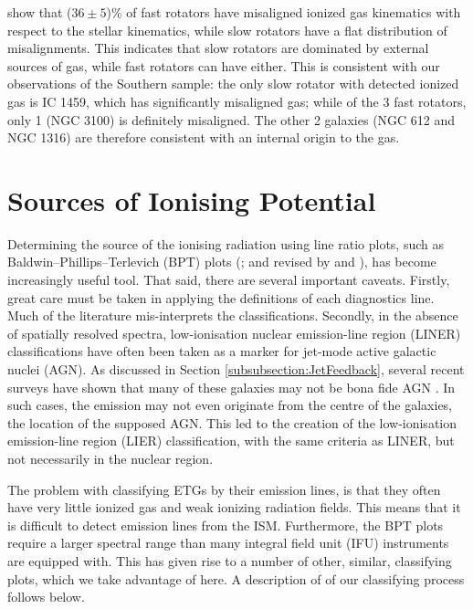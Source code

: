 
	\citet{Davis2011a} show that ($36\pm5$)\% of fast rotators have misaligned ionized gas kinematics with respect to the stellar kinematics, while slow rotators have a flat distribution of misalignments. This indicates that slow rotators are dominated by external sources of gas, while fast rotators can have either. This is consistent with our observations of the Southern sample: the only slow rotator with detected ionized gas is IC 1459, which has significantly misaligned gas; while of the 3 fast rotators, only 1 (NGC 3100) is definitely misaligned. The other 2 galaxies (NGC 612 and NGC 1316) are therefore consistent with an internal origin to the gas.



\section{Sources of Ionising Potential}
	\label{sec:Diagnostics}
	Determining the source of the ionising radiation using line ratio plots, such as Baldwin--Phillips--Terlevich (BPT) plots (\citealt{Baldwin1981}; and revised by \citealt{Kewley2001, Kewley2006} and \citealt{Kauffmann2003a}), has become increasingly useful tool. That said, there are several important caveats. Firstly, great care must be taken in applying the definitions of each diagnostics line. Much of the literature mis-interprets the classifications. Secondly, in the absence of spatially resolved spectra, low-ionisation nuclear emission-line region (LINER) classifications have often been taken as a marker for jet-mode active galactic nuclei (AGN). As discussed in Section \ref{subsubsection:JetFeedback}, several recent surveys have shown that many of these galaxies may not be bona fide AGN \citep[e.g.][]{Sarzi2005, Sarzi2010, Singh2013, Belfiore2016a}. In such cases, the emission may not even originate from the centre of the galaxies, the location of the supposed AGN. This led to the creation of the low-ionisation emission-line region (LIER) classification, with the same criteria as LINER, but not necessarily in the nuclear region.

	The problem with classifying ETGs by their emission lines, is that they often have very little ionized gas and weak ionizing radiation fields. This means that it is difficult to detect emission lines from the ISM. Furthermore, the BPT plots require a larger spectral range than many integral field unit (IFU) instruments are equipped with. This has given rise to a number of other, similar, classifying plots, which we take advantage of here. A description of of our classifying process follows below. 

